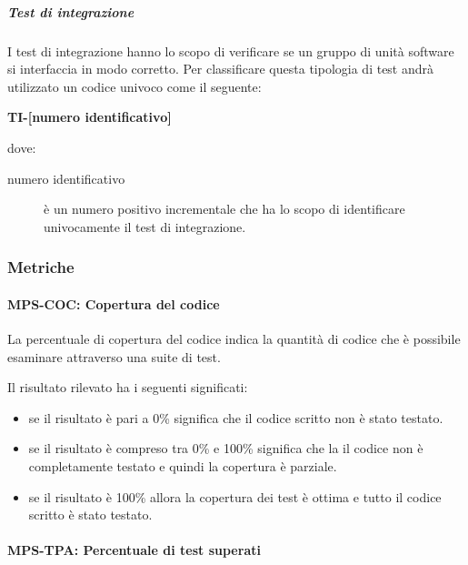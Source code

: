 \documentclass[../../norme-di-progetto.tex]{subfiles}
\begin{document}
\subparagraph{Test di integrazione}%
\label{subp:test_di_integrazione}
I test di integrazione hanno lo scopo di verificare se un gruppo di unità software si interfaccia in modo corretto.
Per classificare questa tipologia di test andrà utilizzato un codice univoco come il seguente:
\begin{center}
  \textbf{TI-[numero identificativo]}
\end{center}
dove:
\begin{description}
  \item [numero identificativo] è un numero positivo incrementale che ha lo scopo di identificare univocamente il test di integrazione.
\end{description}




\subsubsection{Metriche}%
\label{subs:verifica/metriche}

\paragraph{MPS-COC: Copertura del codice}%
\label{par:MPS-COC_copertura_codice}

La percentuale di copertura del codice indica la quantità di codice che è possibile esaminare attraverso una suite di test.

Il risultato rilevato ha i seguenti significati:
\begin{itemize}
  \item se il risultato è pari a 0\% significa che il codice scritto non è stato testato.
  \item se il risultato è compreso tra 0\% e 100\% significa che la il codice non è completamente testato e quindi la copertura è parziale.
  \item se il risultato è 100\% allora la copertura dei test è ottima e tutto il codice scritto è stato testato.
\end{itemize}



\paragraph{MPS-TPA: Percentuale di test superati}%
\label{par:MPS-TPA_test_passati}
\end{document}
